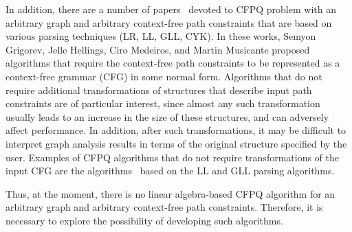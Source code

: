 In addition, there are a number of papers~\cite{hellings2014conjunctive,medeiros2018efficient,santos2018bottom,grigorev2017context} devoted to CFPQ problem with an arbitrary graph and arbitrary context-free path constraints that are based on various parsing techniques (LR, LL, GLL, CYK). In these works, Semyon Grigorev, Jelle Hellings, Ciro Medeiros, and Martin Musicante proposed algorithms that require the context-free path constraints to be represented as a context-free grammar (CFG) in some normal form. Algorithms that do not require additional transformations of structures that describe input path constraints are of particular interest, since almost any such transformation usually leads to an increase in the size of these structures, and can adversely affect performance. In addition, after such transformations, it may be difficult to interpret graph analysis results in terms of the original structure specified by the user. Examples of CFPQ algorithms that do not require transformations of the input CFG are the algorithms~\cite{medeiros2018efficient,grigorev2017context} based on the LL and GLL parsing algorithms.

Thus, at the moment, there is no linear algebra-based CFPQ algorithm for an arbitrary graph and arbitrary context-free path constraints. Therefore, it is necessary to explore the possibility of developing such algorithms.

